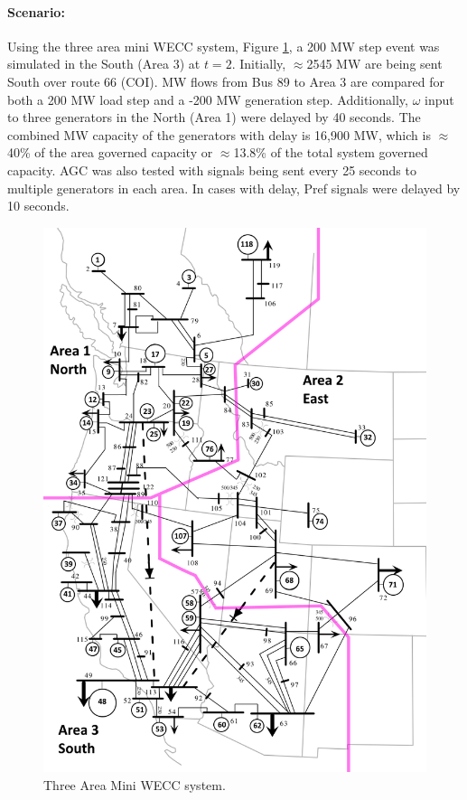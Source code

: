 \documentclass[12pt]{article}
\begin{document}
\paragraph{Scenario: } 
Using the three area mini WECC system, Figure \ref{fig: miniWECC}, a 200 MW step event was simulated in the South (Area 3) at $t=2$.
Initially, $\approx$2545 MW are being sent South over route 66 (COI).
MW flows from Bus 89 to Area 3 are compared for both a 200 MW load step and a -200 MW generation step.
Additionally, $\omega$ input to three generators in the North (Area 1) were delayed by 40 seconds.
The combined MW capacity of the generators with delay is 16,900 MW, which is $\approx$40\% of the area governed capacity or $\approx$13.8\% of the total system governed capacity.
AGC was also tested with signals being sent every 25 seconds to multiple generators in each area.
In cases with delay, Pref signals were delayed by 10 seconds.

\begin{figure}[!ht]
	\centering
	\footnotesize
	\includegraphics[height=6 in]{../../../paint.net/miniWECC_split/miniWECC_split03}
	\caption{Three Area Mini WECC system.}
	\label{fig: miniWECC}
\end{figure}
\end{document}
